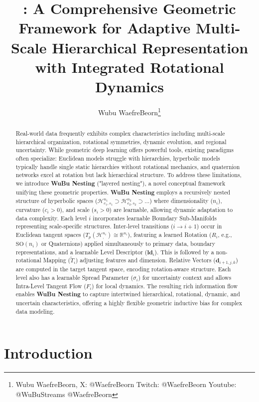 \documentclass[11pt, twoside]{article} %
\title{\wubu: A Comprehensive Geometric Framework for Adaptive Multi-Scale Hierarchical Representation with Integrated Rotational Dynamics}
\author{
    Wubu WaefreBeorn\thanks{Wubu WaefreBeorn, X: @WaefreBeorn Twitch: @WaefreBeorn Youtube: @WuBuStreams @WaefreBeorn}
}
\date{} %
\newcommand{\HypSpaceCmd}[3]{\mathcal{H}^{#1}_{#2, #3}} %
\newcommand{\R}{\mathbb{R}} %
\newcommand{\SOcmd}[1]{\text{SO}(#1)} %
\newcommand{\wubu}{\textbf{WuBu Nesting}} %
\begin{document}
\maketitle

\begin{abstract}
Real-world data frequently exhibits complex characteristics including multi-scale hierarchical organization, rotational symmetries, dynamic evolution, and regional uncertainty. While geometric deep learning offers powerful tools, existing paradigms often specialize: Euclidean models struggle with hierarchies, hyperbolic models typically handle single static hierarchies without rotational mechanics, and quaternion networks excel at rotation but lack hierarchical structure. To address these limitations, we introduce \wubu{} ("layered nesting"), a novel conceptual framework unifying these geometric properties. \wubu{} employs a recursively nested structure of hyperbolic spaces ($\HypSpaceCmd{n_1}{c_1}{s_1} \supset \HypSpaceCmd{n_2}{c_2}{s_2} \supset \dots$) where dimensionality ($n_i$), curvature ($c_i > 0$), and scale ($s_i > 0$) are learnable, allowing dynamic adaptation to data complexity. Each level $i$ incorporates learnable Boundary Sub-Manifolds representing scale-specific structures. Inter-level transitions ($i \rightarrow i+1$) occur in Euclidean tangent spaces ($T_p(\HypSpaceCmd{n_i}{}{}) \cong \R^{n_i}$), featuring a learned Rotation ($R_i$, e.g., $\SOcmd{n_i}$ or Quaternions) applied simultaneously to primary data, boundary representations, and a learnable Level Descriptor ($\mathbf{ld}_i$). This is followed by a non-rotational Mapping ($\tilde{T}_i$) adjusting features and dimension. Relative Vectors ($\mathbf{d}_{i+1, j, k}$) are computed in the target tangent space, encoding rotation-aware structure. Each level also has a learnable Spread Parameter ($\sigma_i$) for uncertainty context and allows Intra-Level Tangent Flow ($F_i$) for local dynamics. The resulting rich information flow enables \wubu{} to capture intertwined hierarchical, rotational, dynamic, and uncertain characteristics, offering a highly flexible geometric inductive bias for complex data modeling.
\end{abstract}


\section{Introduction}
\label{sec:introduction}
\end{document}
